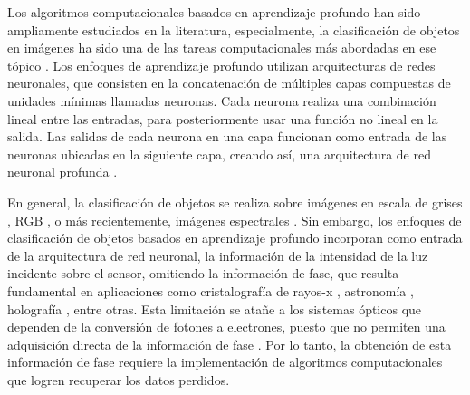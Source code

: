 


Los algoritmos computacionales basados en aprendizaje profundo han sido ampliamente estudiados en la literatura, especialmente, la clasificación de objetos en imágenes ha sido una de las tareas computacionales más abordadas en ese tópico . Los enfoques de aprendizaje profundo utilizan arquitecturas de redes neuronales, que consisten en la concatenación de múltiples capas compuestas de unidades mínimas llamadas neuronas. Cada neurona realiza una combinación lineal entre las entradas, para posteriormente usar una función no lineal en la salida. Las salidas de cada neurona en una capa funcionan como entrada de las neuronas ubicadas en la siguiente capa, creando así, una arquitectura de red neuronal profunda . 

En general, la clasificación de objetos se realiza sobre imágenes en escala de grises , RGB , o más recientemente, imágenes espectrales . Sin embargo, los enfoques de clasificación de objetos basados en aprendizaje profundo incorporan como entrada de la arquitectura de red neuronal, la información de la intensidad de la luz incidente sobre el sensor, omitiendo la información de fase, que resulta fundamental en aplicaciones como cristalografía de rayos-x , astronomía , holografía , entre otras. Esta limitación se atañe a los sistemas ópticos que dependen de la conversión de fotones a electrones, puesto que no permiten una adquisición directa de la información de fase . Por lo tanto, la obtención de esta información de fase requiere la implementación de algoritmos computacionales que logren recuperar los datos perdidos.

